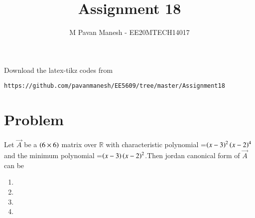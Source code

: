 \documentclass[journal,12pt]{IEEEtran}
\begin{document}
     \def\rightbox#1{\makebox[0in][r]{#1}}
     \def\centbox#1{\makebox[0in]{#1}}
     \def\topbox#1{\raisebox{-\baselineskip}[0in][0in]{#1}}
     \def\midbox#1{\raisebox{-0.5\baselineskip}[0in][0in]{#1}}
\vspace{3cm}
\title{Assignment 18}
\author{M Pavan Manesh - EE20MTECH14017}
\maketitle
\bigskip
\renewcommand{\thefigure}{\theenumi}
\renewcommand{\thetable}{\theenumi}
%
Download the latex-tikz codes from 
%
\begin{lstlisting}
https://github.com/pavanmanesh/EE5609/tree/master/Assignment18
\end{lstlisting}
\section{\textbf{Problem}}
Let $\vec{A}$ be a $\left(6 \times 6\right)$ matrix over $\mathbb{R}$ with characteristic polynomial =$\left(x-3\right)^2\left(x-2\right)^4$ and the minimum polynomial =$\left(x-3\right)\left(x-2\right)^2$.Then jordan canonical form of $\vec{A}$ can be
\begin{enumerate}
\item {}
\item {}
\item {}
\item {}
\end{enumerate}
\newpage
\end{document}
